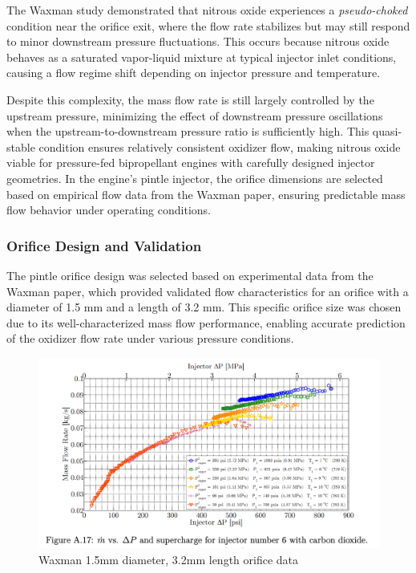 The Waxman study demonstrated that nitrous oxide experiences a \emph{pseudo-choked} condition near the orifice exit, where the flow rate stabilizes but may still respond to minor downstream pressure fluctuations. This occurs because nitrous oxide behaves as a saturated vapor-liquid mixture at typical injector inlet conditions, causing a flow regime shift depending on injector pressure and temperature.

Despite this complexity, the mass flow rate is still largely controlled by the upstream pressure, minimizing the effect of downstream pressure oscillations when the upstream-to-downstream pressure ratio is sufficiently high. This quasi-stable condition ensures relatively consistent oxidizer flow, making nitrous oxide viable for pressure-fed bipropellant engines with carefully designed injector geometries. In the engine's pintle injector, the orifice dimensions are selected based on empirical flow data from the Waxman paper, ensuring predictable mass flow behavior under operating conditions.



\subsubsection{Orifice Design and Validation}

The pintle orifice design was selected based on experimental data from the Waxman paper, which provided validated flow characteristics for an orifice with a diameter of 1.5 mm and a length of 3.2 mm. This specific orifice size was chosen due to its well-characterized mass flow performance, enabling accurate prediction of the oxidizer flow rate under various pressure conditions.

\begin{figure}[H]
    \centering
    \includegraphics[width=1.0\linewidth]{waxmanorifice6.png}
    \caption{Waxman 1.5mm diameter, 3.2mm length orifice data}
    \label{fig:wax_orifice}
\end{figure}


